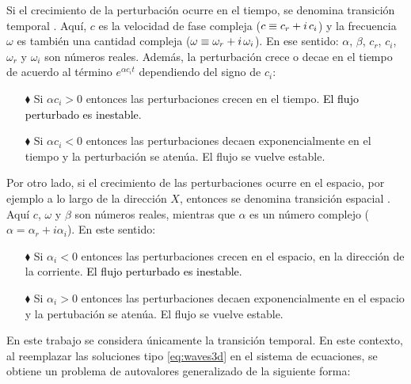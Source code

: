 Si el crecimiento de la perturbación ocurre en el tiempo, se denomina transición temporal \cite{machaca2024}. Aquí, $c$ es la velocidad de fase compleja ($c \equiv c_r + i \hspace{0.5mm} c_i$) y la frecuencia $\omega$ es también una cantidad compleja ($\omega \equiv \omega_r + i \hspace{0.5mm} \omega_i$). En ese sentido: $\alpha$, $\beta$, $c_r$, $c_i$, $\omega_r$ y $\omega_i$ son números reales. Además, la perturbación crece o decae en el tiempo de acuerdo al término $e^{\alpha c_i t}$ dependiendo del signo de $c_i$: 

\begin{itemize}
\item[$\blacklozenge$] Si $\alpha c_i > 0$ entonces las perturbaciones crecen en el tiempo. \textcolor{black}{El flujo perturbado es inestable}.

\item[$\blacklozenge$] Si $\alpha c_i < 0$ entonces las perturbaciones decaen exponencialmente en el tiempo y la perturbación se atenúa. El flujo se vuelve estable.
\end{itemize}

Por otro lado, si el crecimiento de las perturbaciones ocurre en el espacio, por ejemplo a lo largo de la dirección $X$, entonces se denomina transición espacial \cite{machaca2024}. Aquí $c$, $\omega$ y $\beta$ son números reales, mientras que $\alpha$ es un número complejo ($\alpha = \alpha_r + i \alpha_i$). En este sentido:

\begin{itemize}
\item[$\blacklozenge$] Si $\alpha_i < 0$ entonces las perturbaciones crecen en el espacio, en la dirección de la \linebreak corriente. \textcolor{black}{El flujo perturbado es inestable}.

\item[$\blacklozenge$] Si $\alpha_i > 0$ entonces las perturbaciones decaen exponencialmente en el espacio y la pertubación se atenúa. El flujo se vuelve estable.
\end{itemize}

En este trabajo se considera únicamente la transición temporal. En este contexto, al reemplazar las soluciones tipo \ref{eq:waves3d} en el sistema de ecuaciones, se obtiene un problema de autovalores generalizado de la siguiente forma:


